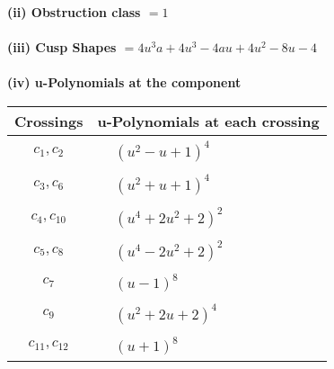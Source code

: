 \documentclass[1p]{elsarticle_modified}
\theoremstyle{definition}
\begin{document}
\flushleft \textbf{(ii) Obstruction class $= 1$}\\~\\
\flushleft \textbf{(iii) Cusp Shapes $= 4 u^3 a+4 u^3-4 a u+4 u^2-8 u-4$}\\~\\
\newpage\renewcommand{\arraystretch}{1}
\flushleft \textbf{(iv) u-Polynomials at the component}\newline \\
\begin{tabular}{m{50pt}|m{274pt}}
Crossings & \hspace{64pt}u-Polynomials at each crossing \\
\hline $$\begin{aligned}c_{1},c_{2}\end{aligned}$$&$\begin{aligned}
&(u^2- u+1)^4
\end{aligned}$\\
\hline $$\begin{aligned}c_{3},c_{6}\end{aligned}$$&$\begin{aligned}
&(u^2+u+1)^4
\end{aligned}$\\
\hline $$\begin{aligned}c_{4},c_{10}\end{aligned}$$&$\begin{aligned}
&(u^4+2 u^2+2)^2
\end{aligned}$\\
\hline $$\begin{aligned}c_{5},c_{8}\end{aligned}$$&$\begin{aligned}
&(u^4-2 u^2+2)^2
\end{aligned}$\\
\hline $$\begin{aligned}c_{7}\end{aligned}$$&$\begin{aligned}
&(u-1)^8
\end{aligned}$\\
\hline $$\begin{aligned}c_{9}\end{aligned}$$&$\begin{aligned}
&(u^2+2 u+2)^4
\end{aligned}$\\
\hline $$\begin{aligned}c_{11},c_{12}\end{aligned}$$&$\begin{aligned}
&(u+1)^8
\end{aligned}$\\
\hline
\end{tabular}\\~\\
\end{document}
